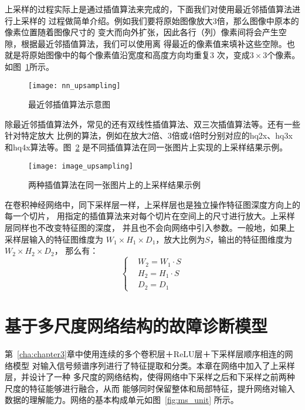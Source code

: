上采样的过程实际上是通过插值算法来完成的，下面我们对使用最近邻插值算法进行上采样的
过程做简单介绍。例如我们要将原始图像放大3倍，那么图像中原本的像素位置随着图像尺寸的
变大而向外扩张，因此各行（列）像素间将会产生空隙，根据最近邻插值算法，我们可以使用离
得最近的像素值来填补这些空隙。也就是将原始图像中的每个像素值沿宽度和高度方向均重复3
次，变成$3\times 3$个像素。如图~\ref{fig:nn_upsampling}所示。
\begin{figure}[ht]
  \centering
  \texttt{[image: nn\_upsampling]}
  \caption{最近邻插值算法示意图}
  \label{fig:nn_upsampling}
\end{figure}

除最近邻插值算法外，常见的还有双线性插值算法、双三次插值算法等。还有一些针对特定放大
比例的算法，例如在放大2倍、3倍或4倍时分别对应的hq2x、hq3x和hq4x算法等。图~\ref{fig:image_upsampling}
是不同插值算法在同一张图片上实现的上采样结果示例。
\begin{figure}[ht]
  \centering
  \texttt{[image: image\_upsampling]}
  \caption{两种插值算法在同一张图片上的上采样结果示例}
  \label{fig:image_upsampling}
\end{figure}

在卷积神经网络中，同下采样层一样，上采样层也是独立操作特征图深度方向上的每一个切片，
用指定的插值算法来对每个切片在空间上的尺寸进行放大。上采样层同样也不改变特征图的深度，
并且也不会向网络中引入参数。一般地，如果上采样层输入的特征图维度为
$W_1\times H_1\times D_1$，放大比例为$S$，输出的特征图维度为$W_2\times H_2\times D_2$，
那么有：
\begin{equation}
  \label{equ:chap4:upsampling_dim}
  \left\{\begin{aligned}
    & W_2 = W_1 \cdot S \\
    & H_2 = H_1 \cdot S \\
    & D_2 = D_1
  \end{aligned}\right.
\end{equation}

\section{基于多尺度网络结构的故障诊断模型}

第~\ref{cha:chapter3}章中使用连续的多个卷积层＋ReLU层＋下采样层顺序相连的网络模型
对输入信号频谱序列进行了特征提取和分类。本章在网络中加入了上采样层，并设计了一种
多尺度的网络结构，使得网络中下采样之后和下采样之前两种尺度的特征能够进行融合，从而
能够同时保留整体和局部特征，提升网络对输入数据的理解能力。网络的基本构成单元如图~\ref{fig:ms_unit}
所示。

